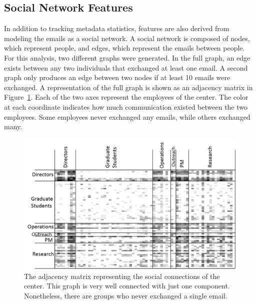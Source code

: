 \documentclass[12pt]{report}
\begin{document}
\subsection{Social Network Features}
In addition to tracking metadata statistics, features are also derived from modeling the emails as a social network.
A social network is composed of nodes, which represent people, and edges, which represent the emails between people.
For this analysis, two different graphs were generated.
In the full graph, an edge exists between any two individuals that exchanged at least one email.
A second graph only produces an edge between two nodes if at least 10 emails were exchanged.
A representation of the full graph is shown as an adjacency matrix in Figure~\ref{fig:adj_matrix}.
Each of the two axes represent the employees of the center.
The color at each coordinate indicates how much communication existed between the two employees.
Some employees never exchanged any emails, while others exchanged many.

\begin{figure}[t]
    \centering
    \includegraphics[width=\columnwidth,trim={4mm .5mm 0mm 5mm},clip]{adj_matrix}
    \vspace{-17pt}
    \caption{The adjacency matrix representing the social connections of the center.  This graph is very well connected with just one component.  Nonetheless, there are groups who never exchanged a single email.}
    \label{fig:adj_matrix}
\end{figure}
\end{document}
